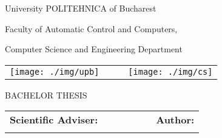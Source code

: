 \begin{titlepage}
	\begin{center}
		{\Large University POLITEHNICA of Bucharest}
		\par\vspace*{2mm}
		{\Large Faculty of Automatic Control and Computers,
		
		Computer Science and Engineering Department}
		\par\vspace*{3mm}
		\begin{table*}[h]
        	\begin{center}
				\begin{tabular}{cccc}
                    \texttt{[image: ./img/upb]}
					& & &
					\texttt{[image: ./img/cs]}
            	\end{tabular}
			\end{center}
		\end{table*}
		
		\par\vspace*{35mm}
		{\Huge BACHELOR THESIS}
		\par\vspace*{15mm}
		{\Huge \VARtitleen}
		\par\vspace*{35mm}
		\begin{table*}[h]
        	\begin{center}
				\begin{tabular}{lcccccl}
					\Large \textbf{\Large Scientific Adviser:}
					\vspace*{1mm} &&&&&& \Large \textbf{\Large Author:}\vspace*{1mm} \\
					\Large \VARadviser &&&&&& \Large \VARauthor
				\end{tabular}
			\end{center}
		\end{table*}

		\par\vspace*{40mm}
		\Large \VARtitlefooteren
	\end{center}
\end{titlepage}

